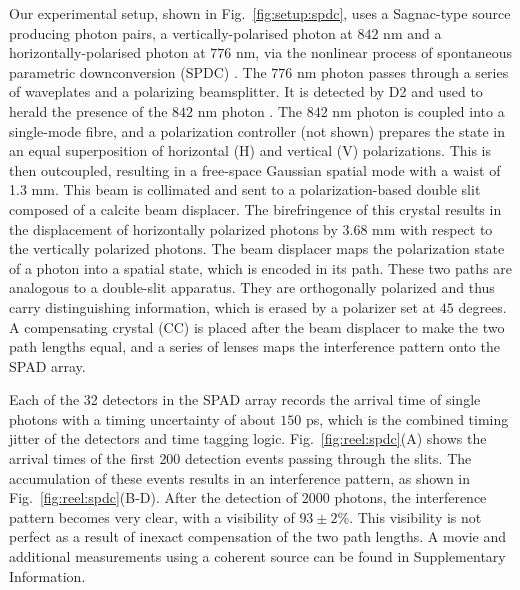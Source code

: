 \documentclass[prl,reprint,twocolumn,amsmath,preprintnumbers,amssymb,superscriptaddress]{revtex4-1}
\newcommand{\com}[1]{\textcolor{ForestGreen}{{\textsc{\textbf{[#1]}}}}}
\newcommand{\figref}[1]{Fig.~\ref{#1}}
\begin{document}
Our experimental setup, shown in \figref{fig:setup:spdc}, uses a Sagnac-type source \cite{Hamel2010} producing photon pairs, a vertically-polarised photon at $842$ nm and a horizontally-polarised photon at $776$ nm, via the nonlinear process of spontaneous parametric downconversion (SPDC) \cite{Hubel2010}.  The $776$ nm photon passes through a series of waveplates and a polarizing beamsplitter. It is detected by D2 and used to herald the presence of the $842$ nm photon \cite{Rarity1987}.
The $842$ nm photon is coupled into a single-mode fibre, and a polarization controller (not shown) prepares the state in an equal superposition of horizontal (H) and vertical (V) polarizations. This is then outcoupled, resulting in a free-space Gaussian spatial mode with a waist of 1.3 mm. This beam is collimated and sent to a polarization-based double slit composed of a calcite beam displacer. The birefringence of this crystal results in the displacement of horizontally polarized photons by $3.68$ mm with respect to the vertically polarized photons. The beam displacer maps the polarization state of a photon into a spatial state, which is encoded in its path. These two paths are analogous to a double-slit apparatus. They are orthogonally polarized and thus carry distinguishing information, which is erased by a polarizer set at $45$ degrees. A compensating crystal (CC) is placed after the beam displacer to make the two path lengths equal, and a series of lenses maps the interference pattern onto the SPAD array.

Each of the 32 detectors in the SPAD array records the arrival time of single photons with a  timing uncertainty of about $150$ ps, which is the combined timing jitter of the detectors and time tagging logic. \figref{fig:reel:spdc}(A) shows the arrival times of the first $200$ detection events passing through the slits. The accumulation of these events results in an interference pattern, as shown in \figref{fig:reel:spdc}(B-D). After the detection of $2000$ photons, the interference pattern becomes very clear, with a visibility of $93 \pm 2$\%. This visibility is not perfect as a result of inexact compensation of the two path lengths. A movie and additional measurements using a coherent source can be found in Supplementary Information.

\end{document}

